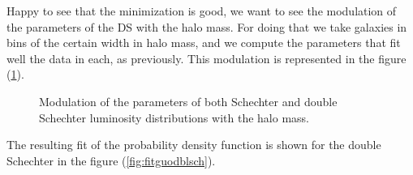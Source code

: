 Happy to see that the minimization is good, we want to see the modulation of
the parameters of the DS with the halo mass. For doing that we take galaxies in
bins of the certain width in halo mass, and we compute the parameters that fit
well the data in each, as previously. This modulation is represented in the
figure (\ref{fig:modsch}).
%
\begin{figure}[p]
    \centering
    \begin{minipage}{\linewidth}
    \centering
    \end{minipage}
    \begin{minipage}{\linewidth}
    \centering
    \end{minipage}
    \caption{Modulation of the parameters of both Schechter and
    double Schechter luminosity distributions with the halo mass.}
\label{fig:modsch}
\end{figure}
%
The resulting fit of the probability density function is shown for the double
Schechter in the figure (\ref{fig:fitguodblsch}).

